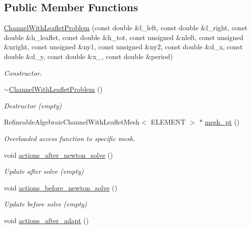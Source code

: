 \subsection*{Public Member Functions}
\begin{DoxyCompactItemize}
\item 
\hyperlink{classChannelWithLeafletProblem_a3c5a4c97ec66fe53bc130005c74a47b5}{Channel\+With\+Leaflet\+Problem} (const double \&l\+\_\+left, const double \&l\+\_\+right, const double \&h\+\_\+leaflet, const double \&h\+\_\+tot, const unsigned \&nleft, const unsigned \&nright, const unsigned \&ny1, const unsigned \&ny2, const double \&d\+\_\+x, const double \&d\+\_\+y, const double \&x\+\_, const double \&period)
\begin{DoxyCompactList}\small\item\em Constructor. \end{DoxyCompactList}\item 
\hyperlink{classChannelWithLeafletProblem_a5dec8333d345e4bcaac7fcd5b463eafc}{$\sim$\+Channel\+With\+Leaflet\+Problem} ()
\begin{DoxyCompactList}\small\item\em Destructor (empty) \end{DoxyCompactList}\item 
Refineable\+Algebraic\+Channel\+With\+Leaflet\+Mesh$<$ E\+L\+E\+M\+E\+NT $>$ $\ast$ \hyperlink{classChannelWithLeafletProblem_a023dc7718a98f820e4bc4541150a0c08}{mesh\+\_\+pt} ()
\begin{DoxyCompactList}\small\item\em Overloaded access function to specific mesh. \end{DoxyCompactList}\item 
void \hyperlink{classChannelWithLeafletProblem_a2fcba9dc98f40bbca1919a715fa087d7}{actions\+\_\+after\+\_\+newton\+\_\+solve} ()
\begin{DoxyCompactList}\small\item\em Update after solve (empty) \end{DoxyCompactList}\item 
void \hyperlink{classChannelWithLeafletProblem_a5721dfad66d13a1ae60adce7801dcb12}{actions\+\_\+before\+\_\+newton\+\_\+solve} ()
\begin{DoxyCompactList}\small\item\em Update before solve (empty) \end{DoxyCompactList}\item 
void \hyperlink{classChannelWithLeafletProblem_a7978755f073d950e5012951ced9e455e}{actions\+\_\+after\+\_\+adapt} ()

\end{DoxyCompactItemize}
